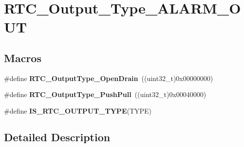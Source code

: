 \hypertarget{group___r_t_c___output___type___a_l_a_r_m___o_u_t}{\section{R\-T\-C\-\_\-\-Output\-\_\-\-Type\-\_\-\-A\-L\-A\-R\-M\-\_\-\-O\-U\-T}
\label{group___r_t_c___output___type___a_l_a_r_m___o_u_t}
}
\subsection*{Macros}
\begin{DoxyCompactItemize}
\item 
\hypertarget{group___r_t_c___output___type___a_l_a_r_m___o_u_t_gafe3640c3f98b1ad3a609623088335aeb}{\#define {\bfseries R\-T\-C\-\_\-\-Output\-Type\-\_\-\-Open\-Drain}~((uint32\-\_\-t)0x00000000)}\label{group___r_t_c___output___type___a_l_a_r_m___o_u_t_gafe3640c3f98b1ad3a609623088335aeb}

\item 
\hypertarget{group___r_t_c___output___type___a_l_a_r_m___o_u_t_ga16861daafb18357d884baf2133adcc17}{\#define {\bfseries R\-T\-C\-\_\-\-Output\-Type\-\_\-\-Push\-Pull}~((uint32\-\_\-t)0x00040000)}\label{group___r_t_c___output___type___a_l_a_r_m___o_u_t_ga16861daafb18357d884baf2133adcc17}

\item 
\#define {\bfseries I\-S\-\_\-\-R\-T\-C\-\_\-\-O\-U\-T\-P\-U\-T\-\_\-\-T\-Y\-P\-E}(T\-Y\-P\-E)
\end{DoxyCompactItemize}


\subsection{Detailed Description}


